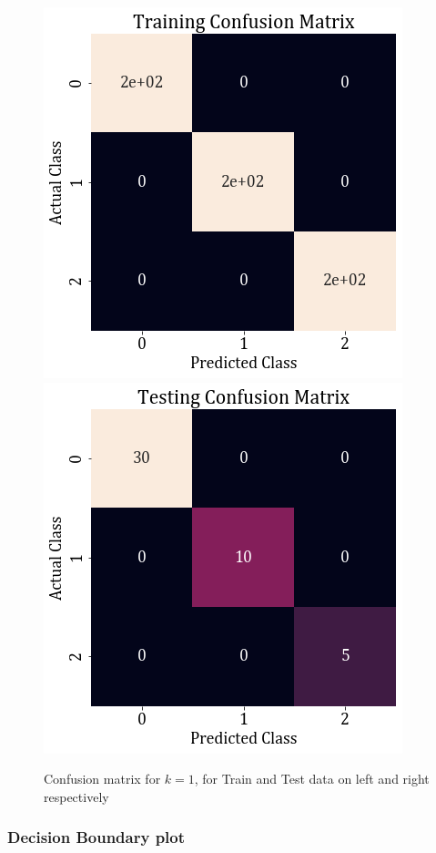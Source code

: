 \documentclass[11pt,a4paper]{article}
\begin{document}
\begin{figure}[H]
    \includegraphics[scale=0.6]{images/1B/1b_conf_mat_knn_train.png}
    \includegraphics[scale=0.6]{images/1B/1b_conf_mat_knn_test.png}
    \caption{Confusion matrix for $k=1$, for Train and Test data on left and right respectively }
    \label{fig:1b_cm_KNN}
\end{figure}

\subsubsection{Decision Boundary plot}
\end{document}
